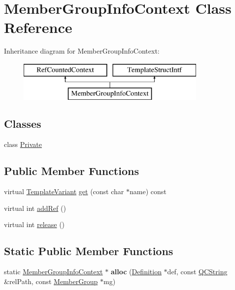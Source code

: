 \hypertarget{class_member_group_info_context}{}\section{Member\+Group\+Info\+Context Class Reference}
\label{class_member_group_info_context}
Inheritance diagram for Member\+Group\+Info\+Context\+:\begin{figure}[H]
\begin{center}
\leavevmode
\includegraphics[height=2.000000cm]{class_member_group_info_context}
\end{center}
\end{figure}
\subsection*{Classes}
\begin{DoxyCompactItemize}
\item 
class \mbox{\hyperlink{class_member_group_info_context_1_1_private}{Private}}
\end{DoxyCompactItemize}
\subsection*{Public Member Functions}
\begin{DoxyCompactItemize}
\item 
virtual \mbox{\hyperlink{class_template_variant}{Template\+Variant}} \mbox{\hyperlink{class_member_group_info_context_ada81dc489837e0e1cf6d9bef4711485d}{get}} (const char $\ast$name) const
\item 
virtual int \mbox{\hyperlink{class_member_group_info_context_a489cd4943cc9a565d3447a6024937a88}{add\+Ref}} ()
\item 
virtual int \mbox{\hyperlink{class_member_group_info_context_a9d31265654c2e5444af3a5fe1a54da46}{release}} ()
\end{DoxyCompactItemize}
\subsection*{Static Public Member Functions}
\begin{DoxyCompactItemize}
\item 
\mbox{\label{class_member_group_info_context_a1fb174d97b31b1a9eb911a54a1c1a6a7}} 
static \mbox{\hyperlink{class_member_group_info_context}{Member\+Group\+Info\+Context}} $\ast$ {\bfseries alloc} (\mbox{\hyperlink{class_definition}{Definition}} $\ast$def, const \mbox{\hyperlink{class_q_c_string}{Q\+C\+String}} \&rel\+Path, const \mbox{\hyperlink{class_member_group}{Member\+Group}} $\ast$mg)
\end{DoxyCompactItemize}


